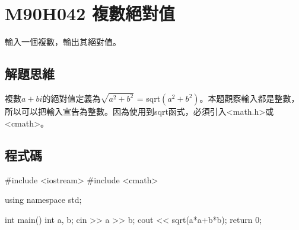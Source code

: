 \section{M90H042 複數絕對值}
輸入一個複數，輸出其絕對值。
\subsection{解題思維}

複數$a+b i$的絕對值定義為$\sqrt{a^2+b^2}$ = sqrt$(a^2+b^2)$。本題觀察輸入都是整數，所以可以把輸入宣告為整數。因為使用到sqrt函式，必須引入<math.h>或<cmath>。

\subsection{程式碼}
\begin{cppcode}
	#include <iostream>
	#include <cmath>

	using namespace std;
	
	int main()
	{
		int a, b;
		cin >> a >> b;
		cout << sqrt(a*a+b*b);
		return 0;
	}
\end{cppcode}
